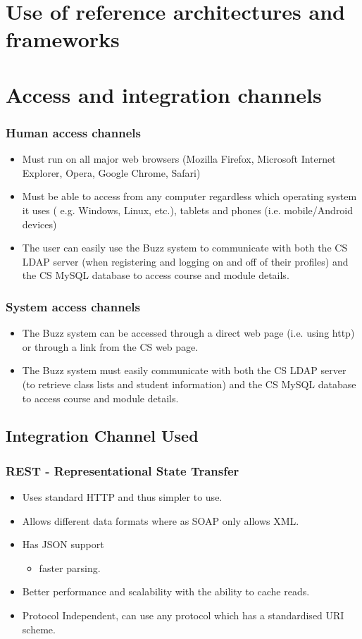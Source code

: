 \documentclass[12pt, oneside]{article}
\begin{document}
\section{Use of reference architectures and frameworks}
\newpage
\section{Access and integration channels}
	\subsubsection{Human access channels}
		\begin{itemize}
			\item Must run on all major web browsers (Mozilla Firefox, Microsoft Internet Explorer, Opera, Google Chrome, Safari)
			\item Must be able to access from any computer regardless which operating system it uses ( e.g. Windows, Linux, etc.), tablets and phones (i.e. mobile/Android devices)
			\item The user can easily use the Buzz system to communicate with both the CS LDAP server (when registering and logging on and off of their profiles) and the CS MySQL database to access course and module details.
		\end{itemize}
		\subsubsection{System access channels}
			\begin{itemize}
				\item The Buzz system can be accessed through a direct web page (i.e. using http) or through a link from the CS web page.
				\item The Buzz system must easily communicate with both the CS LDAP server (to retrieve class lists and student information) and the CS MySQL database to access course and module details.
			\end{itemize}
	\subsection{Integration Channel Used}
		\subsubsection{REST - Representational State Transfer}
		\begin{itemize}
			\item Uses standard HTTP and thus simpler to use.
		 	\item Allows different data formats where as SOAP only allows XML.
			\item Has JSON support
				\begin{itemize}
					\item faster parsing.				
				\end{itemize}			 
			\item Better performance and scalability with the ability to cache reads.
			\item Protocol Independent, can use any protocol which has a standardised URI scheme.		
		\end{itemize}
\end{document}
